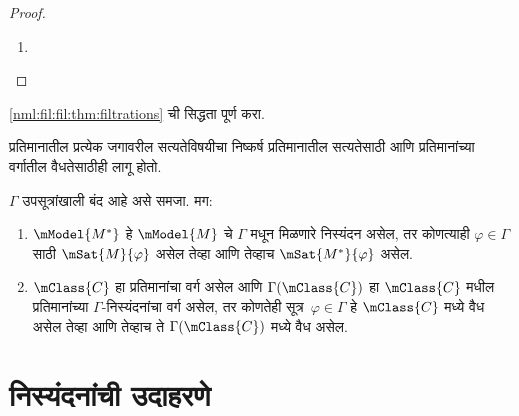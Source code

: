 \begin{proof}
\begin{enumerate}
    \item {}
  \end{enumerate}
\end{proof}

\begin{prob}
  \ref{nml:fil:fil:thm:filtrations} ची सिद्धता पूर्ण करा.
\end{prob}

प्रतिमानातील प्रत्येक जगावरील सत्यतेविषयीचा निष्कर्ष
प्रतिमानातील सत्यतेसाठी आणि प्रतिमानांच्या वर्गातील
वैधतेसाठीही लागू होतो.

\begin{cor}
  $\Gamma$ उपसूत्रांखाली बंद आहे असे समजा. मग:
  \begin{enumerate}
  \item $\mModel{M^*}$ हे $\mModel{M}$ चे $\Gamma$
    मधून मिळणारे निस्यंदन असेल, तर कोणत्याही
    $\varphi \in \Gamma$ साठी $\mSat{M}{\varphi}$ असेल तेव्हा
    आणि तेव्हाच $\mSat{M^*}{\varphi}$ असेल.
  \item $\mClass{C}$ हा प्रतिमानांचा वर्ग असेल आणि
    $\Gamma(\mClass{C})$ हा $\mClass{C}$ मधील प्रतिमानांच्या
    $\Gamma$-निस्यंदनांचा वर्ग असेल, तर कोणतेही
    सूत्र~$\varphi \in \Gamma$ हे $\mClass{C}$ मध्ये
    वैध असेल तेव्हा आणि तेव्हाच ते
    $\Gamma(\mClass{C})$ मध्ये वैध असेल.
  \end{enumerate}
\end{cor}














\section{निस्यंदनांची उदाहरणे}\label{nml:fil:exf:sec}

